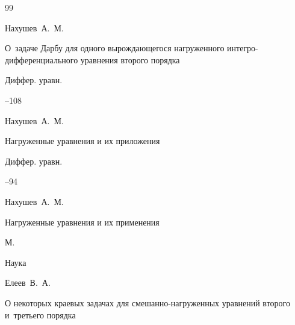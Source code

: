 \begin{thebibliography}{99}










\by Нахушев~А.~М. 

\paper О~задаче Дарбу для одного вырождающегося нагруженного интегро-дифференциального  уравнения второго порядка

\jour Диффер. уравн.




--108









\by Нахушев~А.~М. 

\paper Нагруженные уравнения и их приложения

\jour Диффер. уравн.




–94





\by Нахушев~А.~М.

\book Нагруженные уравнения и их применения 

\publaddr М.

\publ Наука 











\by Елеев~В.~А.

\paper О некоторых краевых задачах для смешанно-нагруженных уравнений второго и~третьего порядка


\end{thebibliography}
